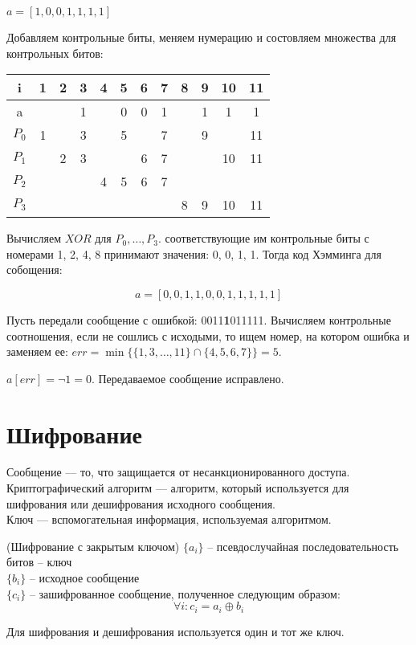 \begin{eg}
    $a = [1, 0, 0, 1, 1, 1, 1]$

    Добавляем контрольные биты, меняем нумерацию и состовляем множества для контрольных битов:

    \begin{tabular}{|c|c|c|c|c|c|c|c|c|c|c|c|}
        \hline
        i & 1 & 2 & 3 & 4 & 5 & 6 & 7 & 8 & 9 & 10 & 11\\
        \hline
        a &   &   & 1 &   & 0 & 0 & 1 &   & 1 & 1  & 1\\
        \hline
        $P_0$ & 1 & & 3 & &5 & &7 & &9 & &11\\
        $P_1$ & & 2 & 3 & & & 6 & 7 & & & 10 & 11\\
        $P_2$ & & & & 4 & 5 &6 & 7 & & & &\\ 
        $P_3$ & & & & & & & & 8& 9 & 10 & 11\\
        \hline 
    \end{tabular}

    Вычисляем $XOR$ для $P_0, \ldots, P_3$. соответствующие им контрольные биты
    с номерами 1, 2, 4, 8 принимают значения: 0, 0, 1, 1. Тогда код Хэмминга для собощения:
    
    $$a = [0, 0, 1, 1, 0, 0, 1, 1, 1, 1, 1]$$

    Пусть передали сообщение с ошибкой: 0011\textbf{1}011111. Вычисляем контрольные соотношения, если не сошлись с исходыми,
    то ищем номер, на котором ошибка и заменяем ее: $err = \min\{\{1, 3, \ldots, 11\} \cap \{4, 5, 6, 7\}\} = 5$.

    $a[err] = \lnot 1 = 0$. Передаваемое сообщение исправлено.
\end{eg}

\section{Шифрование}

\begin{definition}
    Сообщение — то, что защищается от несанкционированного доступа.\\
    Криптографический алгоритм — алгоритм, который используется для шифрования или дешифрования исходного сообщения.\\
    Ключ — вспомогательная информация, используемая алгоритмом.
\end{definition}

\begin{eg}(Шифрование с закрытым ключом)
    $\{a_i\}$ -- псевдослучайная последовательность битов -- ключ\\
    $\{b_i\}$ -- исходное сообщение\\
    $\{c_i\}$ -- зашифрованное сообщение, полученное следующим образом:\\

    $$\forall i: c_i = a_i \oplus b_i$$

    Для шифрования и дешифрования используется один и тот же ключ.
\end{eg}


